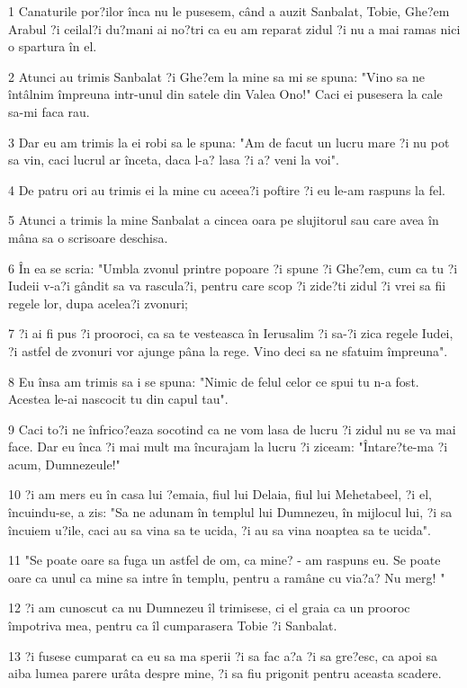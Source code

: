 \par 1 Canaturile por?ilor înca nu le pusesem, când a auzit Sanbalat, Tobie, Ghe?em Arabul ?i ceilal?i du?mani ai no?tri ca eu am reparat zidul ?i nu a mai ramas nici o spartura în el.
\par 2 Atunci au trimis Sanbalat ?i Ghe?em la mine sa mi se spuna: "Vino sa ne întâlnim împreuna intr-unul din satele din Valea Ono!" Caci ei pusesera la cale sa-mi faca rau.
\par 3 Dar eu am trimis la ei robi sa le spuna: "Am de facut un lucru mare ?i nu pot sa vin, caci lucrul ar înceta, daca l-a? lasa ?i a? veni la voi".
\par 4 De patru ori au trimis ei la mine cu aceea?i poftire ?i eu le-am raspuns la fel.
\par 5 Atunci a trimis la mine Sanbalat a cincea oara pe slujitorul sau care avea în mâna sa o scrisoare deschisa.
\par 6 În ea se scria: "Umbla zvonul printre popoare ?i spune ?i Ghe?em, cum ca tu ?i Iudeii v-a?i gândit sa va rascula?i, pentru care scop ?i zide?ti zidul ?i vrei sa fii regele lor, dupa acelea?i zvonuri;
\par 7 ?i ai fi pus ?i prooroci, ca sa te vesteasca în Ierusalim ?i sa-?i zica regele Iudei, ?i astfel de zvonuri vor ajunge pâna la rege. Vino deci sa ne sfatuim împreuna".
\par 8 Eu însa am trimis sa i se spuna: "Nimic de felul celor ce spui tu n-a fost. Acestea le-ai nascocit tu din capul tau".
\par 9 Caci to?i ne înfrico?eaza socotind ca ne vom lasa de lucru ?i zidul nu se va mai face. Dar eu înca ?i mai mult ma încurajam la lucru ?i ziceam: "Întare?te-ma ?i acum, Dumnezeule!"
\par 10 ?i am mers eu în casa lui ?emaia, fiul lui Delaia, fiul lui Mehetabeel, ?i el, încuindu-se, a zis: "Sa ne adunam în templul lui Dumnezeu, în mijlocul lui, ?i sa încuiem u?ile, caci au sa vina sa te ucida, ?i au sa vina noaptea sa te ucida".
\par 11 "Se poate oare sa fuga un astfel de om, ca mine? - am raspuns eu. Se poate oare ca unul ca mine sa intre în templu, pentru a ramâne cu via?a? Nu merg! "
\par 12 ?i am cunoscut ca nu Dumnezeu îl trimisese, ci el graia ca un prooroc împotriva mea, pentru ca îl cumparasera Tobie ?i Sanbalat.
\par 13 ?i fusese cumparat ca eu sa ma sperii ?i sa fac a?a ?i sa gre?esc, ca apoi sa aiba lumea parere urâta despre mine, ?i sa fiu prigonit pentru aceasta scadere.
